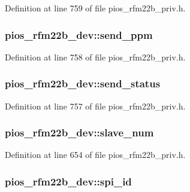 Definition at line 759 of file pios\-\_\-rfm22b\-\_\-priv.\-h.

\hypertarget{structpios__rfm22b__dev_a44f9d9da0b1740ea9f077873f766ee45}{
\subsubsection[{send\-\_\-ppm}]{ pios\-\_\-rfm22b\-\_\-dev\-::send\-\_\-ppm}}\label{structpios__rfm22b__dev_a44f9d9da0b1740ea9f077873f766ee45}


Definition at line 758 of file pios\-\_\-rfm22b\-\_\-priv.\-h.

\hypertarget{structpios__rfm22b__dev_abf332b1a47bf1d07fbc580382acd4b95}{
\subsubsection[{send\-\_\-status}]{ pios\-\_\-rfm22b\-\_\-dev\-::send\-\_\-status}}\label{structpios__rfm22b__dev_abf332b1a47bf1d07fbc580382acd4b95}


Definition at line 757 of file pios\-\_\-rfm22b\-\_\-priv.\-h.

\hypertarget{structpios__rfm22b__dev_a4e0db01351dfac40720073969a7fafae}{
\subsubsection[{slave\-\_\-num}]{ pios\-\_\-rfm22b\-\_\-dev\-::slave\-\_\-num}}\label{structpios__rfm22b__dev_a4e0db01351dfac40720073969a7fafae}


Definition at line 654 of file pios\-\_\-rfm22b\-\_\-priv.\-h.

\hypertarget{structpios__rfm22b__dev_a7fae761882f21a9a0088db1f81dd41da}{
\subsubsection[{spi\-\_\-id}]{ pios\-\_\-rfm22b\-\_\-dev\-::spi\-\_\-id}}\label{structpios__rfm22b__dev_a7fae761882f21a9a0088db1f81dd41da}


